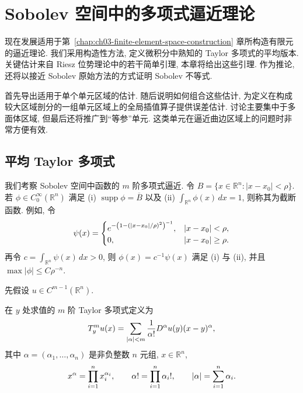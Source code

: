 \clearpage
{}
\section{Sobolev 空间中的多项式逼近理论}
\label{chap:ch04-polynomial-approximation}

现在发展适用于第~\ref{chap:ch03-finite-element-space-construction} 章所构造有限元的逼近理论. 我们采用构造性方法, 定义微积分中熟知的 Taylor 多项式的平均版本. 关键估计来自 Riesz 位势理论中的若干简单引理, 本章将给出这些引理. 作为推论, 还将以接近 Sobolev 原始方法的方式证明 Sobolev 不等式.

首先导出适用于单个单元区域的估计. 随后说明如何组合这些估计, 为定义在构成较大区域剖分的一组单元区域上的全局插值算子提供误差估计. 讨论主要集中于多面体区域, 但最后还将推广到``等参''单元. 这类单元在逼近曲边区域上的问题时非常方便有效.

\subsection{平均 Taylor 多项式}
\label{sec:ch04-averaged-taylor-polynomials}
\setcounter{thmcount}{0}
\setcounter{equation}{0}

我们考察 Sobolev 空间中函数的 $m$ 阶多项式逼近. 令 $B=\{x\in\mathbb R^n:|x-x_0|<\rho\}$. 若 $\phi\in C_0^\infty(\mathbb R^n)$ 满足 (i) $\operatorname{supp}\phi=\overline B$ 以及 (ii) $\int_{\mathbb R^n}\phi(x)\,dx=1$, 则称其为截断函数. 例如, 令
\[
\MathBookFormulaID{formula-ch04-cutoff-function-example}
\psi(x)=
\begin{cases}
e^{-\left(1-(|x-x_0|/\rho)^2\right)^{-1}},&|x-x_0|<\rho,\\
0,&|x-x_0|\geq\rho.
\end{cases}
\]
再令 $c=\int_{\mathbb R^n}\psi(x)\,dx>0$, 则 $\phi(x)=c^{-1}\psi(x)$ 满足 (i) 与 (ii), 并且 $\max|\phi|\leq C\rho^{-n}$.

先假设 $u\in C^{m-1}(\mathbb R^n)$.

\begin{Definition}
\label{def:ch04-taylor-polynomial}
在 $y$ 处求值的 $m$ 阶 Taylor 多项式定义为
\begin{equation}
\MathBookFormulaID{formula-ch04-taylor-polynomial}
\label{eq:ch04-taylor-polynomial}
T_y^m u(x)=\sum_{|\alpha|<m}\frac1{\alpha!}D^\alpha u(y)(x-y)^\alpha,
\end{equation}
其中 $\alpha=(\alpha_1,\ldots,\alpha_n)$ 是非负整数 $n$ 元组, $x\in\mathbb R^n$,
\[
\MathBookFormulaID{formula-ch04-multiindex-conventions}
x^\alpha=\prod_{i=1}^nx_i^{\alpha_i},\qquad
\alpha!=\prod_{i=1}^n\alpha_i!,\qquad
|\alpha|=\sum_{i=1}^n\alpha_i.
\]
\end{Definition}

